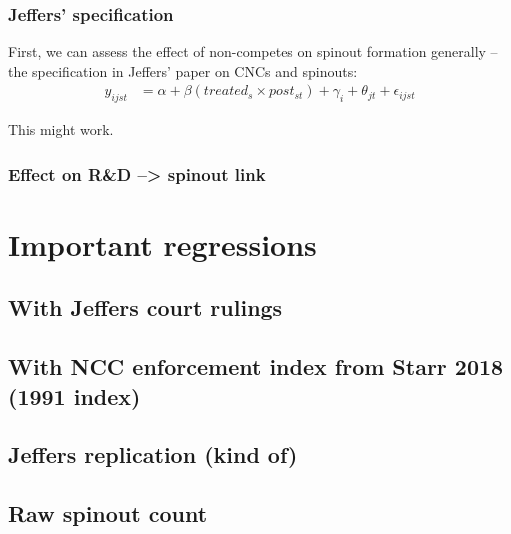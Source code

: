 \documentclass[12pt,english]{article}
\theoremstyle{remark}
\begin{document}
\subsubsection{Jeffers' specification}

First, we can assess the effect of non-competes on spinout formation generally -- the specification in Jeffers' paper on CNCs and spinouts: 
\begin{align*}
	y_{ijst} &= \alpha + \beta(treated_s \times post_{st}) + \gamma_i + \theta_{jt} + \epsilon_{ijst} 
\end{align*}

This might work. 

\subsubsection{Effect on R\&D --> spinout link}


\section{Important regressions}


\linebreak



\subsection{With Jeffers court rulings}



\subsection{With NCC enforcement index from Starr 2018 (1991 index)}



\subsection{Jeffers replication (kind of)}



\subsection{Raw spinout count}
\end{document}
